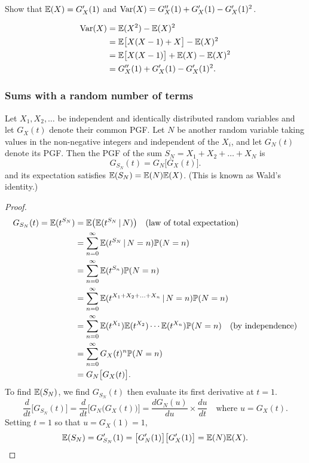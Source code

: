 \begin{exercise}
Show that $\mathbb{E}(X) = G'_X(1)$ and $\text{Var}(X) = G''_X(1) + G'_X(1) - G'_X(1)^2$.
\begin{answer}
\begin{align*}
\text{Var}(X)
	& = \mathbb{E}(X^2) - \mathbb{E}(X)^2 \\
	& = \mathbb{E}\big[X(X-1) + X\big] - \mathbb{E}(X)^2 \\
	& = \mathbb{E}\big[X(X-1)\big] + \mathbb{E}(X) - \mathbb{E}(X)^2 \\
	& = G''_X(1) + G'_X(1) - G'_X(1)^2.
\end{align*}
\end{answer}
\end{exercise}

\subsubsection{Sums with a random number of terms}

\begin{theorem}\label{thm:GF-NofX}
Let $X_1,X_2,\ldots$ be independent and identically distributed random variables and let $G_X(t)$ denote their common PGF. Let $N$ be another random variable taking values in the non-negative integers and independent of the $X_i$, and let $G_N(t)$ denote its PGF. Then the PGF of the sum $S_N=X_1+X_2+\ldots+X_N$ is 
\[
G_{S_N}(t) = G_N\big[G_X(t)\big].
\]
and its expectation satisfies $\mathbb{E}(S_N) = \mathbb{E}(N)\mathbb{E}(X)$. (This is known as Wald's identity.)
\end{theorem}

\begin{proof}
\begin{align*}
G_{S_N}(t) = \mathbb{E}(t^{S_N}) 
	& = \mathbb{E}\big(\mathbb{E}(t^{S_N}\,|\,N)\big) \text{\quad(law of total expectation)}\\
	& = \sum_{n=0}^{\infty}\mathbb{E}(t^{S_N}\,|\,N=n)\mathbb{P}(N=n) \\
	& = \sum_{n=0}^{\infty}\mathbb{E}(t^{S_n})\mathbb{P}(N=n) \\
	& = \sum_{n=0}^{\infty}\mathbb{E}(t^{X_1+X_2+\ldots+X_n}\,|\,N=n)\mathbb{P}(N=n) \\
	& = \sum_{n=0}^{\infty}\mathbb{E}(t^{X_1})\mathbb{E}(t^{X_2})\cdots\mathbb{E}(t^{X_n})\mathbb{P}(N=n) \quad\text{(by independence)}\\
	& = \sum_{n=0}^{\infty}G_X(t)^n\mathbb{P}(N=n) \\
	& = G_N\big[G_X(t)\big].
\end{align*}
To find $\mathbb{E}(S_N)$, we find $G_{S_N}(t)$ then evaluate its first derivative at $t=1$.
\[
\frac{d}{dt}\big[G_{S_N}(t)\big]
	= \frac{d}{dt}\big[G_N\big(G_X(t)\big)\big] 
	= \frac{dG_N(u)}{du}\times\frac{du}{dt}
	\quad\text{where $u=G_X(t)$.}
\]
Setting $t=1$ so that $u=G_X(1)=1$,
\[
\mathbb{E}(S_N) = G'_{S_N}(1) = \big[G'_N(1)\big]\big[G'_X(1)\big] = \mathbb{E}(N)\mathbb{E}(X).
\]
\end{proof}

